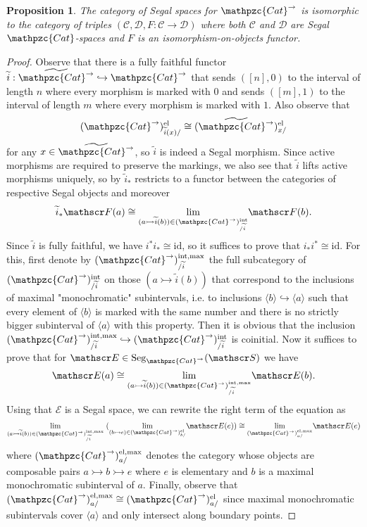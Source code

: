 \documentclass[a4paper, reqno]{amsart}
\newtheorem{prop}[theorem]{Proposition}
\theoremstyle{definition}
\newcommand\cC{\mathscr C}
\newcommand\cD{\mathscr D}
\newcommand\cE{\mathscr E}
\newcommand\cF{\mathscr F}
\newcommand\cS{\mathscr S}
\newcommand\id{\mathrm{id}}
\newcommand\ccat{\mathpzc{Cat}}
\newcommand\maxm{\mathrm{max}}
\newcommand\inrt{\mathrm{int}}
\newcommand\el{\mathrm{el}}
\newcommand\seg{\mathrm{Seg}}
\begin{document}
\begin{prop}\label{prop:pat_bo}
The category of Segal spaces for $\ccat^\rightarrow$ is isomorphic to the category of triples $(\cC,\cD,F:\cC\rightarrow\cD)$ where both $\cC$ and $\cD$ are Segal $\ccat$-spaces and $F$ is an isomorphism-on-objects functor.
\end{prop}
\begin{proof}
Observe that there is a fully faithful functor $\widetilde{i}:\widetilde{\ccat^\rightarrow}\hookrightarrow\ccat^\rightarrow$ that sends $([n],0)$ to the interval of length $n$ where every morphism is marked with $0$ and sends $([m],1)$ to the interval of length $m$ where every morphism is marked with $1$. Also observe that 
\[(\ccat^\rightarrow)^\el_{\widetilde{i}(x)/}\cong(\widetilde{\ccat^\rightarrow})^\el_{x/}\]
for any $x\in\widetilde{\ccat^\rightarrow}$, so $\widetilde{i}$ is indeed a Segal morphism. Since active morphisms are required to preserve the markings, we also see that $\widetilde{i}$ lifts active morphisms uniquely, so by \cite[Proposition 6.3]{chu2019homotopy} $\widetilde{i}_*$ restricts to a functor between the categories of respective Segal objects and moreover 
\[\widetilde{i}_*\cF(a)\cong\underset{(a\rightarrowtail\widetilde{i}(b))\in(\ccat^\rightarrow)^\inrt_{/\widetilde{i}}}{\lim}\cF(b).\]
Since $\widetilde{i}$ is fully faithful, we have $i^*i_*\cong\id$, so it suffices to prove that $i_*i^*\cong\id$. For this, first denote by $(\ccat^\rightarrow)^{\inrt,\maxm}_{/\widetilde{i}}$ the full subcategory of $(\ccat^\rightarrow)^{\inrt}_{/\widetilde{i}}$ on those $(a\rightarrowtail\widetilde{i}(b))$ that correspond to the inclusions of maximal "monochromatic" subintervals, i.e. to inclusions $\langle b\rangle\hookrightarrow\langle a\rangle$ such that every element of $\langle b\rangle$ is marked with the same number and there is no strictly bigger subinterval of $\langle a\rangle$ with this property. Then it is obvious that the inclusion $(\ccat^\rightarrow)^{\inrt,\maxm}_{/\widetilde{i}}\hookrightarrow(\ccat^\rightarrow)^{\inrt}_{/\widetilde{i}}$ is coinitial. Now it suffices to prove that for $\cE\in\seg_{\ccat^\rightarrow}(\cS)$ we have
\[\cE(a)\cong \underset{(a\rightarrowtail\widetilde{i}(b))\in(\ccat^\rightarrow)^{\inrt,\maxm}_{/\widetilde{i}}}{\lim}\cE(b).\]
Using that $\cE$ is a Segal space, we can rewrite the right term of the equation as 
\[\underset{(a\rightarrowtail\widetilde{i}(b))\in(\ccat^\rightarrow)^{\inrt,\maxm}_{/\widetilde{i}}}{\lim}\;(\underset{(b\rightarrowtail e)\in(\ccat^\rightarrow)^\el_{b/}}{\lim}\cE(e))\cong\underset{(\ccat^\rightarrow)^{\el,\maxm}_{a/}}{\lim}\cE(e)\]
where $(\ccat^\rightarrow)^{\el,\maxm}_{a/}$ denotes the category whose objects are composable pairs $a\rightarrowtail b\rightarrowtail e$ where $e$ is elementary and $b$ is a maximal monochromatic subinterval of $a$. Finally, observe that $(\ccat^\rightarrow)^{\el,\maxm}_{a/}\cong (\ccat^\rightarrow)^\el_{a/}$ since maximal monochromatic subintervals cover $\langle a\rangle$ and only intersect along boundary points.
\end{proof}
\end{document}
